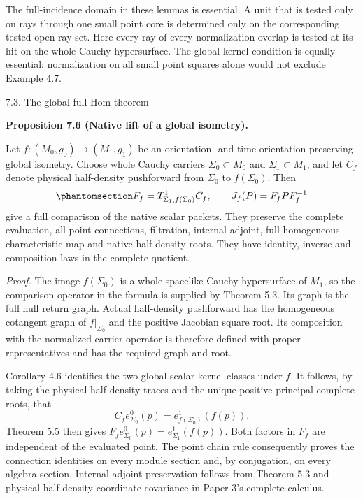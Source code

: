 \documentclass[
  english,
  11pt,
  reqno]{amsart}
\makeatletter
\newcommand{\paperstatementsection}{\@startsection{subsection}{2}%
  \z@{.5\linespacing\@plus.7\linespacing}{.35\baselineskip}%
  {\normalfont\bfseries}}
\newcommand{\paperfirststatement}[1]{%
  {\normalfont\bfseries #1\par}%
  \nobreak\@afterindenttrue\@afterheading}
\makeatother
\begin{document}
The full-incidence domain in these lemmas is essential. A unit that is
tested only on rays through one small point core is determined only on
the corresponding tested open ray set. Here every ray of every
normalization overlap is tested at its hit on the whole Cauchy
hypersurface. The global kernel condition is equally essential:
normalization on all small point squares alone would not exclude Example
4.7.

\protect{}\label{sec:global-full-hom-proof}
\paperstatementsection{7.3. The global full Hom
theorem}\label{the-global-full-hom-theorem}
\paperfirststatement{\protect{}\label{prop:global-native-isometry-lift}Proposition 7.6 (Native lift of a global isometry).}

Let \(f:(M_0,g_0)\to(M_1,g_1)\) be an orientation- and
time-orientation-preserving global isometry. Choose whole Cauchy
carriers \(\Sigma_0\subset M_0\) and \(\Sigma_1\subset M_1\), and let
\(C_f\) denote physical half-density pushforward from \(\Sigma_0\) to
\(f(\Sigma_0)\). Then
\begin{equation}\protect\phantomsection\label{eq:global-native-isometry-lift}{
F_f=T^1_{\Sigma_1,f(\Sigma_0)}C_f,
\qquad
J_f(P)=F_f P F_f^{-1}
}\end{equation} give a full comparison of the native scalar packets.
They preserve the complete evaluation, all point connections,
filtration, internal adjoint, full homogeneous characteristic map and
native half-density roots. They have identity, inverse and composition
laws in the complete quotient.

\emph{Proof.} The image \(f(\Sigma_0)\) is a whole spacelike Cauchy
hypersurface of \(M_1\), so the comparison operator in the formula is
supplied by Theorem 5.3. Its graph is the full null return graph. Actual
half-density pushforward has the homogeneous cotangent graph of
\(f|_{\Sigma_0}\) and the positive Jacobian square root. Its composition
with the normalized carrier operator is therefore defined with proper
representatives and has the required graph and root.

Corollary 4.6 identifies the two global scalar kernel classes under
\(f\). It follows, by taking the physical half-density traces and the
unique positive-principal complete roots, that \[
C_f e_{\Sigma_0}^0(p)
 =e^1_{f(\Sigma_0)}(f(p)).
\] Theorem 5.5 then gives
\(F_f e^0_{\Sigma_0}(p)=e^1_{\Sigma_1}(f(p))\). Both factors in \(F_f\)
are independent of the evaluated point. The point chain rule
consequently proves the connection identities on every module section
and, by conjugation, on every algebra section. Internal-adjoint
preservation follows from Theorem 5.3 and physical half-density
coordinate covariance in Paper 3's complete calculus.
\end{document}
